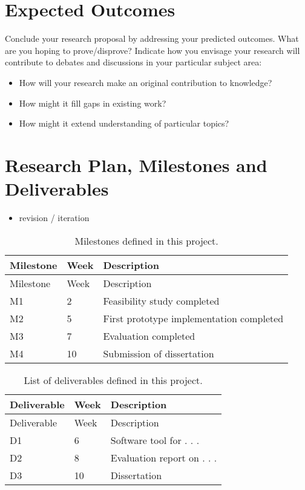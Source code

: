 \section{Expected Outcomes}\label{expected-outcomes}

Conclude your research proposal by addressing your predicted outcomes.
What are you hoping to prove/disprove? Indicate how you envisage your
research will contribute to debates and discussions in your particular
subject area:

\begin{itemize}
\item
  How will your research make an original contribution to knowledge?
\item
  How might it fill gaps in existing work?
\item
  How might it extend understanding of particular topics?
\end{itemize}

\section{Research Plan, Milestones and
Deliverables}\label{research-plan-milestones-and-deliverables}



\begin{itemize}
\tightlist
\item
  revision / iteration
\end{itemize}

\begin{longtable}[]{@{}lll@{}}
\caption{Milestones defined in this project.}\tabularnewline
\toprule\noalign{}
Milestone & Week & Description \\
\midrule\noalign{}
\endfirsthead
\toprule\noalign{}
Milestone & Week & Description \\
\midrule\noalign{}
\endhead
\bottomrule\noalign{}
\endlastfoot
M1 & 2 & Feasibility study completed \\
M2 & 5 & First prototype implementation completed \\
M3 & 7 & Evaluation completed \\
M4 & 10 & Submission of dissertation \\
\end{longtable}

\begin{longtable}[]{@{}lll@{}}
\caption{List of deliverables defined in this project.}\tabularnewline
\toprule\noalign{}
Deliverable & Week & Description \\
\midrule\noalign{}
\endfirsthead
\toprule\noalign{}
Deliverable & Week & Description \\
\midrule\noalign{}
\endhead
\bottomrule\noalign{}
\endlastfoot
D1 & 6 & Software tool for . . . \\
D2 & 8 & Evaluation report on . . . \\
D3 & 10 & Dissertation \\
\end{longtable}

